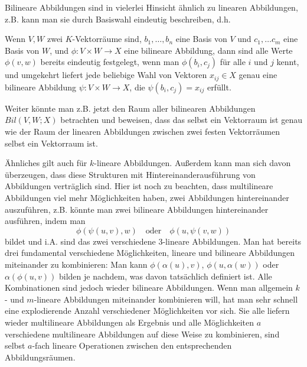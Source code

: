 \begin{remark}
Bilineare Abbildungen sind in vielerlei Hinsicht ähnlich zu linearen Abbildungen, z.B. kann man sie durch Basiswahl eindeutig beschreiben, d.h.

\medbreak
Wenn $V,W$ zwei $K$-Vektorräume sind, $b_1,\ldots,b_n$ eine Basis von $V$ und $c_1, \ldots c_m$ eine Basis von $W$, und $\phi: V\times W\to X$ eine bilineare Abbildung, dann sind alle Werte $\phi(v,w)$ bereits eindeutig festgelegt, wenn man $\phi(b_i,c_j)$ für alle $i$ und $j$ kennt, und umgekehrt liefert jede beliebige Wahl von Vektoren $x_{ij}\in X$ genau eine bilineare Abbildung $\psi: V\times W\to X$, die $\psi(b_i,c_j) = x_{ij}$ erfüllt.

\medbreak
Weiter könnte man z.B. jetzt den Raum aller bilinearen Abbildungen $Bil(V,W;X)$ betrachten und beweisen, dass das selbst ein Vektorraum ist genau wie der Raum der linearen Abbildungen zwischen zwei festen Vektorräumen selbst ein Vektorraum ist.

\medbreak
Ähnliches gilt auch für $k$-lineare Abbildungen. Außerdem kann man sich davon überzeugen, dass diese Strukturen mit Hintereinanderausführung von Abbildungen verträglich sind. Hier ist noch zu beachten, dass multilineare Abbildungen viel mehr Möglichkeiten haben, zwei Abbildungen hintereinander auszuführen, z.B. könnte man zwei bilineare Abbildungen hintereinander ausführen, indem man
\[\phi(\psi(u,v),w)\quad\text{oder}\quad \phi(u,\psi(v,w))\]
bildet und i.A. sind das zwei verschiedene $3$-lineare Abbildungen. Man hat bereits drei fundamental verschiedene Möglichkeiten, lineare und bilineare Abbildungen miteinander zu kombinieren: Man kann $\phi(\alpha(u),v)$, $\phi(u,\alpha(w))$ oder $\alpha(\phi(u,v))$ bilden je nachdem, was davon tatsächlich definiert ist. Alle Kombinationen sind jedoch wieder bilineare Abbildungen. Wenn man allgemein $k$- und $m$-lineare Abbildungen miteinander kombinieren will, hat man sehr schnell eine explodierende Anzahl verschiedener Möglichkeiten vor sich. Sie alle liefern wieder multilineare Abbildungen als Ergebnis und alle Möglichkeiten $a$ verschiedene multilineare Abbildungen auf diese Weise zu kombinieren, sind selbst $a$-fach lineare Operationen zwischen den entsprechenden Abbildungsräumen.


\end{remark}
